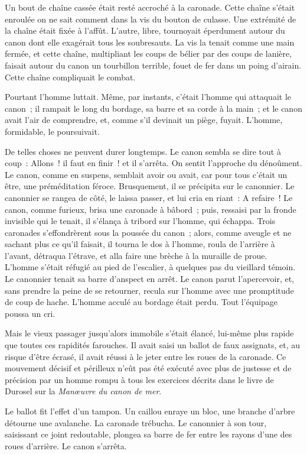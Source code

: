 \documentclass[french,twoside]{book} %
\begin{document}
Un bout de chaîne cassée était resté accroché à la caronade. Cette chaîne s’était enroulée on ne sait comment dans la vis du bouton de culasse. Une extrémité de la chaîne était fixée à l’affût. L’autre, libre, tournoyait éperdument autour du canon dont elle exagérait tous les soubresauts. La vis la tenait comme une main fermée, et cette chaîne, multipliant les coups de bélier par des coups de lanière, faisait autour du canon un tourbillon terrible, fouet de fer dans un poing d’airain. Cette chaîne compliquait le combat.\par
Pourtant l’homme luttait. Même, par instants, c’était l’homme qui attaquait le canon ; il rampait le long du bordage, sa barre et sa corde à la main ; et le canon avait l’air de comprendre, et, comme s’il devinait un piège, fuyait. L’homme, formidable, le poursuivait.\par
De telles choses ne peuvent durer longtemps. Le canon sembla se dire tout à coup : Allons ! il faut en finir ! et il s’arrêta. On sentit l’approche du dénoûment. Le canon, comme en suspens, semblait avoir ou avait, car pour tous c’était un être, une préméditation féroce. Brusquement, il se précipita sur le canonnier. Le canonnier se rangea de côté, le laissa passer, et lui cria en riant : A refaire ! Le canon,  comme furieux, brisa une caronade à bâbord ; puis, ressaisi par la fronde invisible qui le tenait, il s’élança à tribord sur l’homme, qui échappa. Trois caronades s’effondrèrent sous la poussée du canon ; alors, comme aveugle et ne sachant plus ce qu’il faisait, il tourna le dos à l’homme, roula de l’arrière à l’avant, détraqua l’étrave, et alla faire une brèche à la muraille de proue. L’homme s’était réfugié au pied de l’escalier, à quelques pas du vieillard témoin. Le canonnier tenait sa barre d’anspect en arrêt. Le canon parut l’apercevoir, et, sans prendre la peine de se retourner, recula sur l’homme avec une promptitude de coup de hache. L’homme acculé au bordage était perdu. Tout l’équipage poussa un cri.\par
Mais le vieux passager jusqu’alors immobile s’était élancé, lui-même plus rapide que toutes ces rapidités farouches. Il avait saisi un ballot de faux assignats, et, au risque d’être écrasé, il avait réussi à le jeter entre les roues de la caronade. Ce mouvement décisif et périlleux n’eût pas été exécuté avec plus de justesse et de précision par un homme rompu à tous les exercices décrits dans le livre de Durosel sur la \emph{Manœuvre du canon de mer}.\par
Le ballot fit l’effet d’un tampon. Un caillou enraye un bloc, une branche d’arbre détourne une avalanche. La caronade trébucha. Le canonnier à son tour, saisissant ce joint redoutable, plongea sa barre de fer entre les rayons d’une des roues d’arrière. Le canon s’arrêta.\par
\end{document}
